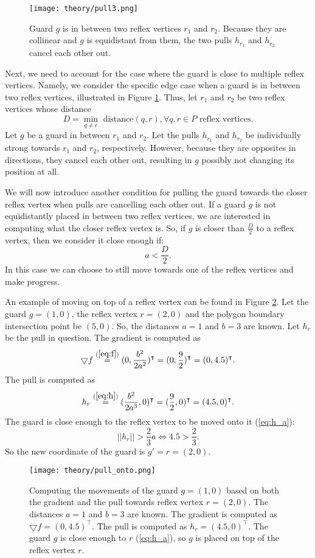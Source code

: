\begin{figure}[h!]
    \centering
    \texttt{[image: theory/pull3.png]}
    \caption{Guard $g$ is in between two reflex vertices $r_1$ and $r_2$. Because they are collinear and $g$ is equidistant from them, the two pulls $h_{r_1}$ and $h_{r_2}$ cancel each other out.}
    \label{fig:pull_cancel}
\end{figure}

Next, we need to account for the case where the guard is close to multiple reflex vertices. Namely, we consider the specific edge case when a guard is in between two reflex vertices, illustrated in Figure \ref{fig:pull_cancel}. Thus, let $r_1$ and $r_2$ be two reflex vertices whose distance $$D = \min_{q \neq r} \text{ distance}(q, r), \forall q, r \in P \text{ reflex vertices}.$$
Let $g$ be a guard in between $r_1$ and $r_2$. Let the pulls $h_{r_1}$ and $h_{r_2}$ be  individually strong towards $r_1$ and $r_2$, respectively. However, because they are opposites in directions, they cancel each other out, resulting in $g$ possibly not changing its position at all.

We will now introduce another condition for pulling the guard towards the closer reflex vertex when pulls are cancelling each other out. If a guard $g$ is not equidistantly placed in between two reflex vertices, we are interested in computing what the closer reflex vertex is. So, if $g$ is closer than $\frac D 2$ to a reflex vertex, then we consider it close enough if: $$a < \frac D 2.$$
In this case we can choose to still move towards one of the reflex vertices and make progress.

An example of moving on top of a reflex vertex can be found in Figure \ref{fig:pull_onto}. Let the guard $g = (1, 0)$, the reflex vertex $r = (2, 0)$ and the polygon boundary intersection point be $(5, 0)$. So, the distances $a = 1$ and $b = 3$ are known. Let $h_r$ be the pull in question. The gradient is computed as
$$\bigtriangledown f \overset{(\ref{eq:f})}{=} (0, \frac{b^2}{2a^2})^\intercal = (0, \frac{9}{2})^\intercal = (0, 4.5)^\intercal.$$
The pull is computed as 
$$h_r \overset{(\ref{eq:h})}{=} (\frac{b^2}{2a^3}, 0)^\intercal = (\frac{9}{2}, 0)^\intercal = (4.5, 0)^\intercal.$$
The guard is close enough to the reflex vertex to be moved onto it (\ref{eq:h_a}):
$$||h_r|| > \frac 2 3 a \iff 4.5 > \frac 2 3.$$
So the new coordinate of the guard is $g' = r = (2, 0)$.

\begin{figure}
    \centering
    \texttt{[image: theory/pull\_onto.png]}
    \caption{Computing the movements of the guard $g = (1, 0)$ based on both the gradient and the pull towards reflex vertex $r = (2, 0)$. The distances $a = 1$ and $b = 3$ are known. The gradient is computed as $\bigtriangledown f = (0, 4.5)^\intercal$. The pull is computed as $h_r  = (4.5, 0)^\intercal$. The guard $g$ is close enough to $r$ (\ref{eq:h_a}), so $g$ is placed on top of the reflex vertex $r$.}
    \label{fig:pull_onto}
\end{figure}

